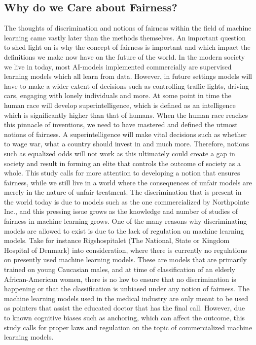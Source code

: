 \documentclass[11pt, fleqn, titlepage]{article}
\begin{document}
	\subsection{Why do we Care about Fairness?}\label{why_do_we_care}
	The thoughts of discrimination and notions of fairness within the field of machine learning came vastly later than the methods themselves. An important question to shed light on is why the concept of fairness is important and which impact the definitions we make now have on the future of the world. In the modern society we live in today, most AI-models implemented commercially are supervised learning models which all learn from data. However, in future settings models will have to make a wider extent of decisions such as controlling traffic lights, driving cars, engaging with lonely individuals and more. At some point in time the human race will develop superintelligence, which is defined as an intelligence which is significantly higher than that of humans. \cite{superint} When the human race reaches this pinnacle of inventions, we need to have mastered and defined the utmost notions of fairness. A superintelligence will make vital decisions such as whether to wage war, what a country should invest in and much more. Therefore, notions such as equalized odds will not work as this ultimately could create a gap in society and result in forming an elite that controls the outcome of society as a whole. This study calls for more attention to developing a notion that ensures fairness, while we still live in a world where the consequences of unfair models are merely in the nature of unfair treatment. The discrimination that is present in the world today is due to models such as the one commercialized by Northpointe Inc., and this pressing issue grows as the knowledge and number of studies of fairness in machine learning grows. One of the many reasons why discriminating models are allowed to exist is due to the lack of regulation on machine learning models. Take for instance Rigshospitalet (The National, State or Kingdom Hospital of Denmark) into consideration, where there is currently no regulations on presently used  machine learning models. These are models that are primarily trained on young Caucasian males, and at time of classification of an elderly African-American women, there is no law to ensure that no discrimination is happening or that the classification is unbiased under any notion of fairness. The machine learning models used in the medical industry are only meant to be used as pointers that assist the educated doctor that has the final call. However, due to known cognitive biases such as anchoring, which can affect the outcome, this study calls for proper laws and regulation on the topic of commercialized machine learning models.
\end{document}
